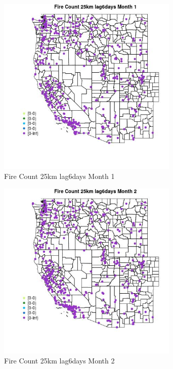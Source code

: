 \begin{figure} 
\centering  
\includegraphics[width=0.77\textwidth]{Code_Outputs/Report_ML_input_PM25_Step4_part_e_de_duplicated_aves_compiled_2019-05-18wNAs_MapObsMo1Fire_Count_25km_lag6days.jpg} 
\caption{\label{fig:Report_ML_input_PM25_Step4_part_e_de_duplicated_aves_compiled_2019-05-18wNAsMapObsMo1Fire_Count_25km_lag6days}Fire Count 25km lag6days Month 1} 
\end{figure} 
 

\begin{figure} 
\centering  
\includegraphics[width=0.77\textwidth]{Code_Outputs/Report_ML_input_PM25_Step4_part_e_de_duplicated_aves_compiled_2019-05-18wNAs_MapObsMo2Fire_Count_25km_lag6days.jpg} 
\caption{\label{fig:Report_ML_input_PM25_Step4_part_e_de_duplicated_aves_compiled_2019-05-18wNAsMapObsMo2Fire_Count_25km_lag6days}Fire Count 25km lag6days Month 2} 
\end{figure} 
 


